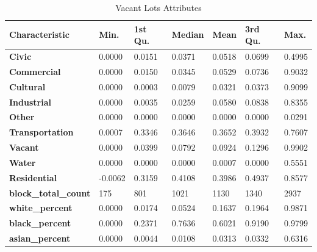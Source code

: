 \documentclass{article}
\begin{document}
\begin{table}[H]
\begin{center}
\caption{\label{tab:af}Vacant Lots Attributes}
\begin{tabular}{lllllll}
\hline
\textbf{Characteristic}      & \textbf{Min.} & \textbf{1st Qu.} & \textbf{Median} & \textbf{Mean} & \textbf{3rd Qu.} & \textbf{Max.} \\ \hline
\textbf{Civic}               & 0.0000        & 0.0151           & 0.0371          & 0.0518        & 0.0699           & 0.4995        \\
\textbf{Commercial}          & 0.0000        & 0.0150           & 0.0345          & 0.0529        & 0.0736           & 0.9032        \\
\textbf{Cultural}            & 0.0000        & 0.0003           & 0.0079          & 0.0321        & 0.0373           & 0.9099        \\
\textbf{Industrial}          & 0.0000        & 0.0035           & 0.0259          & 0.0580        & 0.0838           & 0.8355        \\
\textbf{Other}               & 0.0000        & 0.0000           & 0.0000          & 0.0000        & 0.0000           & 0.0291        \\
\textbf{Transportation}      & 0.0007        & 0.3346           & 0.3646          & 0.3652        & 0.3932           & 0.7607        \\
\textbf{Vacant}              & 0.0000        & 0.0399           & 0.0792          & 0.0924        & 0.1296           & 0.9902        \\
\textbf{Water}               & 0.0000        & 0.0000           & 0.0000          & 0.0007        & 0.0000           & 0.5551        \\
\textbf{Residential}         & -0.0062       & 0.3159           & 0.4108          & 0.3986        & 0.4937           & 0.8577        \\
\textbf{block\_total\_count} & 175           & 801              & 1021            & 1130          & 1340             & 2937          \\
\textbf{white\_percent}      & 0.0000        & 0.0174           & 0.0524          & 0.1637        & 0.1964           & 0.9871        \\
\textbf{black\_percent}      & 0.0000        & 0.2371           & 0.7636          & 0.6021        & 0.9190           & 0.9799        \\
\textbf{asian\_percent}      & 0.0000        & 0.0044           & 0.0108          & 0.0313        & 0.0332           & 0.6316        \\

\end{tabular}
\end{center}
\end{table}
\end{document}
